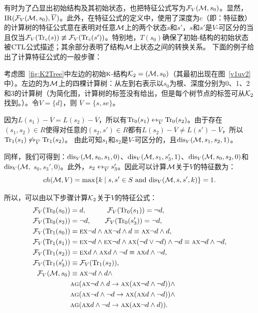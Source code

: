 有时为了凸显出初始结构及其初始状态，也把特征公式写为${\cal F}_V({\cal M}, s_0)$。显然，$\textrm{IR}({\cal F}_V({\cal M}, s_0), \overline V)$。此外，在特征公式的定义中，使用了深度为$c$（即：特征数）的计算树的特征公式意在表明对任意${\cal M}$上的两个状态$s$和$s'$，$s$和$s'$是$V$-可区分的当且仅当${\cal F}_V(\textrm{Tr}_c(s))\not \equiv {\cal F}_V(\textrm{Tr}_c(s'))$。特别地，$T(s_0)$确保了初始\MPK-结构的初始状态被$\textrm{CTL}$公式描述；其余部分表明了结构${\cal M}$上状态之间的转换关系。
下面的例子给出了计算特征公式的一般步骤：

\begin{example}\label{ex:4}
	考虑图~\ref{fig:K2Tree}中左边的初始$\textsc{k}$-结构${\cal K}_2= ({\cal M}, s_0)$（其最初出现在图~\ref{v1uv2}中）。左边的为${\cal M}$上的四棵计算树：从左到右表示以$s_0$为根、深度分别为0、1、2和3的计算树（为简化图，计算树的标签没有给出，但是每个树节点的标签可从${\cal K}_2$找到。）。令$V=\{d\}$，则 $\overline{V}=\{s, se\}$。
	
	因为$L(s_1) - \overline{V} = L(s_2) - \overline{V}$，所以有$\textrm{Tr}_0(s_1) \leftrightarrow_{\overline{V}} \textrm{Tr}_0(s_2)$。由于存在$(s_1, s_2)\in R$使得对任意的$(s_2, s') \in R$都有$L(s_2)- \overline V \neq L(s') - \overline V$，所以$\textrm{Tr}_1(s_1) \not \leftrightarrow_{\overline{V}} \textrm{Tr}_1(s_2)$。
	由此可知$s_1$和$s_2$是$V$-可区分的，且$\textrm{dis}_{V}({\cal M}, s_1, s_2, 1)$。
	
	 同样，我们可得到：$\textrm{dis}_{ V}({\cal M}, s_0, s_1, 0)$、$\textrm{dis}_{V}({\cal M}, s_1, s_3', 1)$、$\textrm{dis}_{V}({\cal M}, s_0, s_2, 0)$和$\textrm{dis}_{ V}({\cal M},$ $s_0, s_3', 0)$。此外，$s_2 \leftrightarrow_{\overline V} s_3'$。因此可以计算${\cal M}$关于$V$的特征数为：
	 $$ch({\cal M}, V)=\max\{k\mid s,s'\in S \text{ and } \textrm{dis}_{V}({\cal M},s,s',k)\} = 1.$$
	 
	  
	所以，可以由以下步骤计算${\cal K}_2$关于$V$的特征公式：
	\begin{align*}
		{\cal F}_V(\textrm{Tr}_0(s_0)) &= d, \qquad \quad {\cal F}_V(\textrm{Tr}_0(s_1)) = \neg d, \\
		{\cal F}_V(\textrm{Tr}_0(s_2)) &= \neg d,  \qquad  {\cal F}_V(\textrm{Tr}_0(s_3')) = \neg d,\\
		{\cal F}_V(\textrm{Tr}_1(s_0)) &= \textsc{e}\textsc{x} \neg d \wedge \textsc{a}\textsc{x} \neg d \wedge d \equiv \textsc{a}\textsc{x} \neg d \wedge d, \\
		{\cal F}_V(\textrm{Tr}_1(s_1)) &= \textsc{e}\textsc{x} \neg d \wedge \textsc{e}\textsc{x} \neg d  \wedge \textsc{a}\textsc{x} (\neg d \vee \neg d) \wedge \neg d 
		\equiv \textsc{a}\textsc{x} \neg d \wedge \neg d, \\
		{\cal F}_V(\textrm{Tr}_1(s_2)) &= \textsc{e}\textsc{x} d  \wedge \textsc{a}\textsc{x} d \wedge \neg d \equiv \textsc{a}\textsc{x} d \wedge \neg d,\\
		{\cal F}_V(\textrm{Tr}_1(s_3')) &\equiv {\cal F}_V(\textrm{Tr}_1(s_2)),\\
		{\cal F}_V({\cal M}, s_0)&\equiv \textsc{a}\textsc{x} \neg d \wedge d \wedge \\
		& \textsc{a} \textsc{g}(\textsc{a}\textsc{x} \neg d \wedge d \rightarrow \textsc{a}\textsc{x}(\textsc{a}\textsc{x} \neg d \wedge \neg d))\wedge \\
		& \textsc{a} \textsc{g}(\textsc{a}\textsc{x} \neg d \wedge \neg d \rightarrow \textsc{a}\textsc{x}(\textsc{a}\textsc{x} d \wedge \neg d)) \wedge\\
		& \textsc{a} \textsc{g}(\textsc{a}\textsc{x} d \wedge \neg d \rightarrow \textsc{a}\textsc{x}(\textsc{a}\textsc{x} \neg d \wedge d)).
	\end{align*}
	

\end{example}

